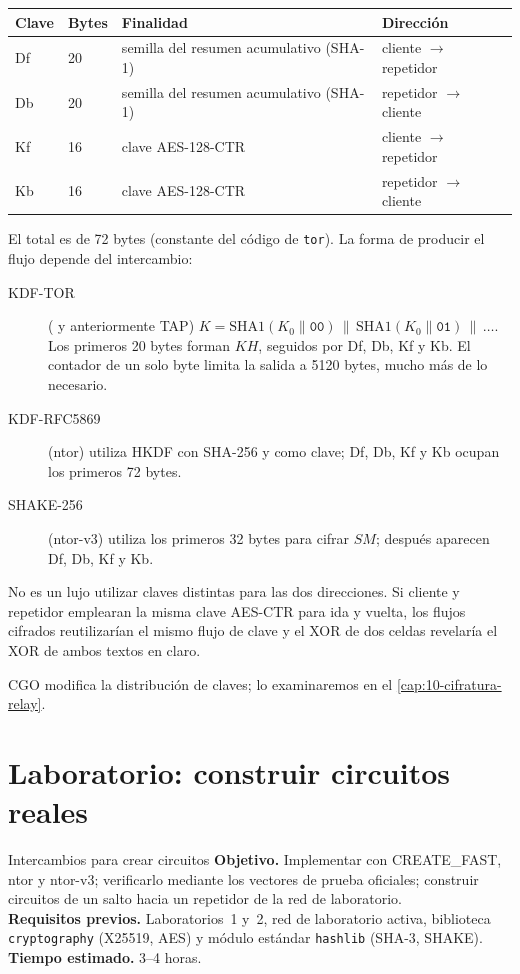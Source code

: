 \begin{center}
\begin{tabular}{llll}
\toprule
Clave & Bytes & Finalidad & Dirección \\
\midrule
Df & 20 & semilla del resumen acumulativo (SHA-1) & cliente $\to$ repetidor \\
Db & 20 & semilla del resumen acumulativo (SHA-1) & repetidor $\to$ cliente \\
Kf & 16 & clave AES-128-CTR & cliente $\to$ repetidor \\
Kb & 16 & clave AES-128-CTR & repetidor $\to$ cliente \\
\bottomrule
\end{tabular}
\end{center}

El total es de 72 bytes (constante  del código de \texttt{tor}). La forma de producir el flujo depende del intercambio:
\begin{description}
  \item[KDF-TOR] ( y anteriormente TAP) $K = \mathrm{SHA1}(K_0 \| \texttt{00}) \,\|\, \mathrm{SHA1}(K_0 \| \texttt{01}) \,\|\, \ldots$. Los primeros 20 bytes forman $KH$, seguidos por Df, Db, Kf y Kb. El contador de un solo byte limita la salida a 5120 bytes, mucho más de lo necesario.
  \item[KDF-RFC5869] (ntor) utiliza HKDF con SHA-256 y  como clave; Df, Db, Kf y Kb ocupan los primeros 72 bytes.
  \item[SHAKE-256] (ntor-v3) utiliza los primeros 32 bytes para cifrar $SM$; después aparecen Df, Db, Kf y Kb.
\end{description}

No es un lujo utilizar claves distintas para las dos direcciones. Si cliente y repetidor emplearan la misma clave AES-CTR para ida y vuelta, los flujos cifrados reutilizarían el mismo flujo de clave y el XOR de dos celdas revelaría el XOR de ambos textos en claro.

CGO modifica la distribución de claves; lo examinaremos en el \cref{cap:10-cifratura-relay}.

\section{Laboratorio: construir circuitos reales}\label{sec:lab-circuiti}

\begin{laboratorio}[3]{Intercambios para crear circuitos}
\textbf{Objetivo.} Implementar  con CREATE\_FAST, ntor y ntor-v3; verificarlo mediante los vectores de prueba oficiales; construir circuitos de un salto hacia un repetidor de la red de laboratorio.\\
\textbf{Requisitos previos.} Laboratorios~1 y~2, red de laboratorio activa, biblioteca \texttt{cryptography} (X25519, AES) y módulo estándar \texttt{hashlib} (SHA-3, SHAKE).\\
\textbf{Tiempo estimado.} 3--4 horas.
\end{laboratorio}

